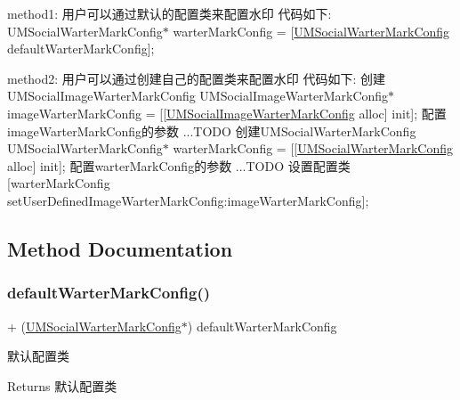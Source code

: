 method1\+: 用户可以通过默认的配置类来配置水印 代码如下\+: U\+M\+Social\+Warter\+Mark\+Config$\ast$ warter\+Mark\+Config = \mbox{[}\mbox{\hyperlink{interface_u_m_social_warter_mark_config}{U\+M\+Social\+Warter\+Mark\+Config}} default\+Warter\+Mark\+Config\mbox{]};

method2\+: 用户可以通过创建自己的配置类来配置水印 代码如下\+: 创建\+U\+M\+Social\+Image\+Warter\+Mark\+Config U\+M\+Social\+Image\+Warter\+Mark\+Config$\ast$ image\+Warter\+Mark\+Config = \mbox{[}\mbox{[}\mbox{\hyperlink{interface_u_m_social_image_warter_mark_config}{U\+M\+Social\+Image\+Warter\+Mark\+Config}} alloc\mbox{]} init\mbox{]}; 配置image\+Warter\+Mark\+Config的参数 ...T\+O\+DO 创建\+U\+M\+Social\+Warter\+Mark\+Config U\+M\+Social\+Warter\+Mark\+Config$\ast$ warter\+Mark\+Config = \mbox{[}\mbox{[}\mbox{\hyperlink{interface_u_m_social_warter_mark_config}{U\+M\+Social\+Warter\+Mark\+Config}} alloc\mbox{]} init\mbox{]}; 配置warter\+Mark\+Config的参数 ...T\+O\+DO 设置配置类 \mbox{[}warter\+Mark\+Config set\+User\+Defined\+Image\+Warter\+Mark\+Config\+:image\+Warter\+Mark\+Config\mbox{]}; 

\subsection{Method Documentation}
\mbox{\label{interface_u_m_social_warter_mark_config_a6cc7b3226f2d0de0135a109ef510c0c8}} 
\subsubsection{\texorpdfstring{default\+Warter\+Mark\+Config()}{defaultWarterMarkConfig()}\hspace{0.1cm}{\footnotesize\ttfamily [1/2]}}
{\footnotesize\ttfamily + (\mbox{\hyperlink{interface_u_m_social_warter_mark_config}{U\+M\+Social\+Warter\+Mark\+Config}}$\ast$) default\+Warter\+Mark\+Config \begin{DoxyParamCaption}{ }\end{DoxyParamCaption}}

默认配置类

\begin{DoxyReturn}{Returns}
默认配置类 
\end{DoxyReturn}
\mbox{\label{interface_u_m_social_warter_mark_config_a6cc7b3226f2d0de0135a109ef510c0c8}} 
